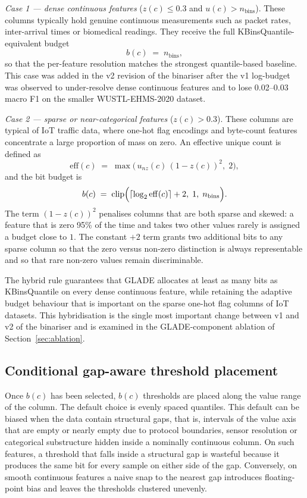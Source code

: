 \documentclass[journal,10pt]{IEEEtran}
\begin{document}
\emph{Case 1 --- dense continuous features} ($z(c) \le 0.3$ and
$u(c) > n_\text{bins}$). These columns typically hold genuine
continuous measurements such as packet rates, inter-arrival times or
biomedical readings. They receive the full
KBinsQuantile-equivalent budget
\begin{equation}
  b(c) \;=\; n_\text{bins},
  \label{eq:dense-budget}
\end{equation}
so that the per-feature resolution matches the strongest
quantile-based baseline. This case was added in the v2 revision of
the binariser after the v1 log-budget was observed to under-resolve
dense continuous features and to lose
0.02--0.03 macro F1 on the smaller WUSTL-EHMS-2020 dataset.

\emph{Case 2 --- sparse or near-categorical features}
($z(c) > 0.3$). These columns are typical of IoT traffic data, where
one-hot flag encodings and byte-count features concentrate a large
proportion of mass on zero. An effective unique count is defined as
\begin{equation}
  \mathrm{eff}(c) \;=\; \max \bigl(\, u_{nz}(c)\,(1 - z(c))^2,\; 2\bigr),
  \label{eq:effunique}
\end{equation}
and the bit budget is
\begin{equation}
  b(c) \;=\; \mathrm{clip}\Bigl(\lceil \log_2 \mathrm{eff}(c)\rceil + 2,\;
             1,\; n_\text{bins}\Bigr).
  \label{eq:budget}
\end{equation}
The term $(1 - z(c))^2$ penalises columns that are both sparse and
skewed: a feature that is zero 95\% of the time and takes two other
values rarely is assigned a budget close to $1$. The constant $+2$
term grants two additional bits to any sparse column so that the
zero versus non-zero distinction is always representable and so that
rare non-zero values remain discriminable.

The hybrid rule guarantees that GLADE allocates at least as many
bits as KBinsQuantile on every dense continuous feature, while
retaining the adaptive budget behaviour that is important on the
sparse one-hot flag columns of IoT datasets. This hybridisation is
the single most important change between v1 and v2 of the binariser
and is examined in the GLADE-component ablation of
Section~\ref{sec:ablation}.

\subsection{Conditional gap-aware threshold placement}
\label{sec:glade-gap}
Once $b(c)$ has been selected, $b(c)$ thresholds are placed along the
value range of the column. The default choice is evenly spaced
quantiles. This default can be biased when the data contain
structural gaps, that is, intervals of the value axis that are empty
or nearly empty due to protocol boundaries, sensor resolution or
categorical substructure hidden inside a nominally continuous column.
On such features, a threshold that falls inside a structural gap is
wasteful because it produces the same bit for every sample on either
side of the gap. Conversely, on smooth continuous features a naive
snap to the nearest gap introduces floating-point bias and leaves the
thresholds clustered unevenly.
\end{document}
